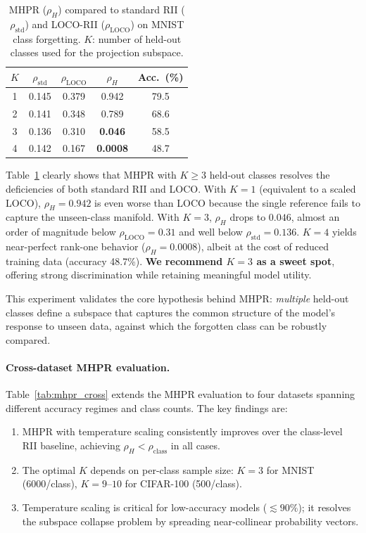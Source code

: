 \documentclass[journal]{IEEEtran}
\theoremstyle{definition}
\begin{document}
\begin{table}[t]
\centering
\caption{MHPR ($\rho_H$) compared to standard RII ($\rho_{\mathrm{std}}$) and LOCO-RII ($\rho_{\mathrm{LOCO}}$) on MNIST class forgetting. $K$: number of held-out classes used for the projection subspace.}\label{tab:mhpr}
\setlength{\tabcolsep}{3pt}
\begin{tabular}{c c c c c}
\toprule
$K$ & $\rho_{\mathrm{std}}$ & $\rho_{\mathrm{LOCO}}$ & $\rho_H$ & Acc.\ (\%) \\
\midrule
1 & 0.145 & 0.379 & 0.942 & 79.5 \\
2 & 0.141 & 0.348 & 0.789 & 68.6 \\
3 & 0.136 & 0.310 & \textbf{0.046} & 58.5 \\
4 & 0.142 & 0.167 & \textbf{0.0008} & 48.7 \\
\bottomrule
\end{tabular}
\end{table}

Table~\ref{tab:mhpr} clearly shows that MHPR with $K \ge 3$ held-out classes resolves the deficiencies of both standard RII and LOCO. With $K=1$ (equivalent to a scaled LOCO), $\rho_H = 0.942$ is even worse than LOCO because the single reference fails to capture the unseen-class manifold. With $K=3$, $\rho_H$ drops to $0.046$, almost an order of magnitude below $\rho_{\mathrm{LOCO}}=0.31$ and well below $\rho_{\mathrm{std}}=0.136$. $K=4$ yields near-perfect rank-one behavior ($\rho_H = 0.0008$), albeit at the cost of reduced training data (accuracy 48.7\%). \textbf{We recommend $K=3$ as a sweet spot}, offering strong discrimination while retaining meaningful model utility.

This experiment validates the core hypothesis behind MHPR: \emph{multiple} held-out classes define a subspace that captures the common structure of the model's response to unseen data, against which the forgotten class can be robustly compared.

\paragraph{Cross-dataset MHPR evaluation.}
Table~\ref{tab:mhpr_cross} extends the MHPR evaluation to four datasets spanning different accuracy regimes and class counts. The key findings are:
\begin{enumerate}
\item MHPR with temperature scaling consistently improves over the class-level RII baseline, achieving $\rho_H < \rho_{\mathrm{class}}$ in all cases.
\item The optimal $K$ depends on per-class sample size: $K=3$ for MNIST (6000/class), $K=9$--$10$ for CIFAR-100 (500/class).
\item Temperature scaling is critical for low-accuracy models ($\lesssim 90\%$); it resolves the subspace collapse problem by spreading near-collinear probability vectors.
\end{enumerate}
\end{document}
